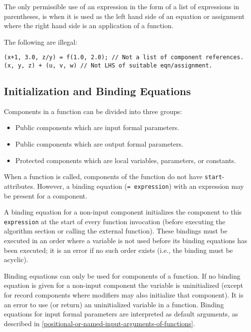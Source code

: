 The only permissible use of an expression in the form of a list of expressions in parentheses, is when it is used as the left hand side of an equation or assignment where the right hand side is an application of a function.

\begin{example}
The following are illegal:
\begin{lstlisting}[language=modelica]
(x+1, 3.0, z/y) = f(1.0, 2.0); // Not a list of component references.
(x, y, z) + (u, v, w) // Not LHS of suitable eqn/assignment.
\end{lstlisting}
\end{example}

\subsection{Initialization and Binding Equations}%
\label{initialization-and-binding-equations-of-components-in-functions}%
\label{initialization-and-declaration-assignments-of-components-in-functions}

Components in a function can be divided into three groups:
\begin{itemize}
\item
  Public components which are input formal parameters.
\item
  Public components which are output formal parameters.
\item
  Protected components which are local variables, parameters, or
  constants.
\end{itemize}

When a function is called, components of the function do not have \lstinline!start!-attributes.
However, a binding equation (\lstinline!= expression!) with an expression may be present for a component.

A binding equation for a non-input component initializes the component to this \lstinline!expression! at the start of every function invocation (before executing the algorithm section or calling the external function).
These bindings must be executed in an order where a variable is not used before its binding equations has been executed; it is an error if no such order exists (i.e., the binding must be acyclic).

Binding equations can only be used for components of a function.
If no binding equation is given for a non-input component the variable is uninitialized (except for record components where modifiers may also initialize that component).
It is an error to use (or return) an uninitialized variable in a function.
Binding equations for input formal parameters are interpreted as default arguments, as described in
\cref{positional-or-named-input-arguments-of-functions}.


